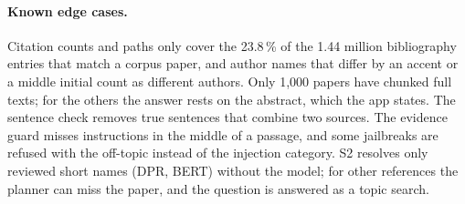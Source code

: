 \paragraph{Known edge cases.}
Citation counts and paths only cover the 23.8\,\% of the 1.44 million bibliography entries that match a corpus paper, and author names that differ by an accent or a middle initial count as different authors.
Only 1{,}000 papers have chunked full texts; for the others the answer rests on the abstract, which the app states.
The sentence check removes true sentences that combine two sources.
The evidence guard misses instructions in the middle of a passage, and some jailbreaks are refused with the off-topic instead of the injection category.
S2 resolves only reviewed short names (DPR, BERT) without the model; for other references the planner can miss the paper, and the question is answered as a topic search.
